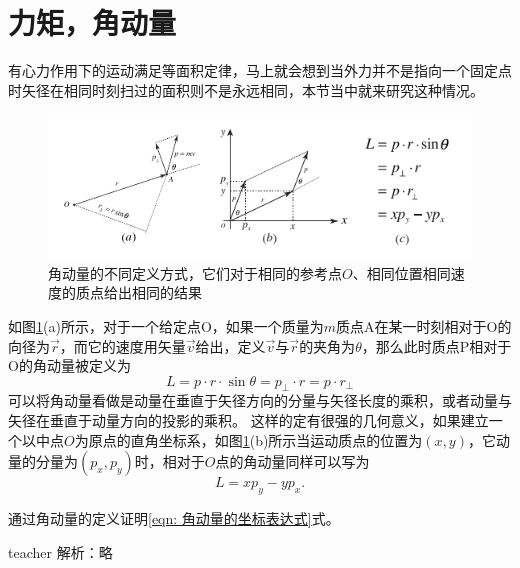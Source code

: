 \section{力矩，角动量}
有心力作用下的运动满足等面积定律，马上就会想到当外力并不是指向一个固定点时矢径在相同时刻扫过的面积则不是永远相同，本节当中就来研究这种情况。
\begin{figure}[htbp]
\begin{center}
\includegraphics{images/angular-momentum-def-angular-momentum.pdf}
\caption{角动量的不同定义方式，它们对于相同的参考点$O$、相同位置相同速度的质点给出相同的结果}
\label{fig: def of angular momentum}
\end{center}
\end{figure}
如图\ref{fig: def of angular momentum}(a)所示，对于一个给定点O，如果一个质量为$m$质点A在某一时刻相对于O的向径为$\vec{r}$，而它的速度用矢量$\vec{v}$给出，定义$\vec{v}$与$\vec{r}$的夹角为$\theta$，那么此时质点P相对于O的角动量被定义为
\begin{equation}
L = p\cdot r\cdot \sin\theta=p_\perp\cdot r = p\cdot r_\perp
\end{equation}
可以将角动量看做是动量在垂直于矢径方向的分量与矢径长度的乘积，或者动量与矢径在垂直于动量方向的投影的乘积。
这样的定有很强的几何意义，如果建立一个以中点$O$为原点的直角坐标系，如图\ref{fig: def of angular momentum}(b)所示当运动质点的位置为$(x,y)$，它动量的分量为$(p_x,p_y)$时，相对于$O$点的角动量同样可以写为
\begin{equation}\label{eqn: 角动量的坐标表达式}
L = xp_y-yp_x.
\end{equation}



\begin{example}
通过角动量的定义证明\ref{eqn: 角动量的坐标表达式}式。
\begin{taggedblock}{teacher}
\newline
解析：略
\end{taggedblock}
\end{example}


